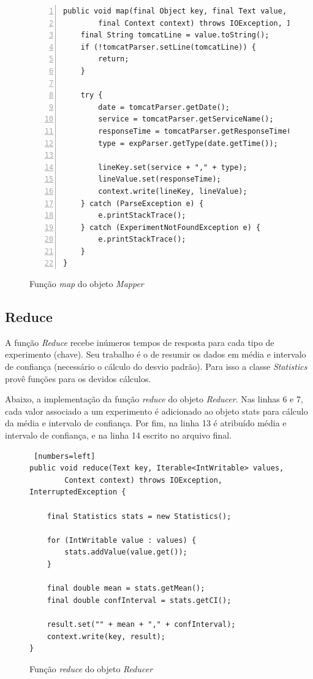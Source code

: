 \documentclass[brazil, a4paper,12pt]{article}
\begin{document}
\begin{figure} [!htb]
\begin{center}
\footnotesize
\begin{lstlisting}[numbers=left]
public void map(final Object key, final Text value,
		final Context context) throws IOException, InterruptedException {
	final String tomcatLine = value.toString();
	if (!tomcatParser.setLine(tomcatLine)) {
		return;
	}

	try {
		date = tomcatParser.getDate();
		service = tomcatParser.getServiceName();
		responseTime = tomcatParser.getResponseTime();
		type = expParser.getType(date.getTime());

		lineKey.set(service + "," + type);
		lineValue.set(responseTime);
		context.write(lineKey, lineValue);
	} catch (ParseException e) {
		e.printStackTrace();
	} catch (ExperimentNotFoundException e) {
		e.printStackTrace();
	}
}
\end{lstlisting}
\end{center}
\caption{Função \emph{map} do objeto \emph{Mapper}}
\end{figure}


\subsection{Reduce}
A função \emph{Reduce} recebe inúmeros tempos de resposta para cada tipo de
experimento (chave). Seu trabalho é o de resumir os dados em média e intervalo
de confiança (necessário o cálculo do desvio padrão). Para isso a classe
\emph{Statistics} provê funções para os devidos cálculos.

Abaixo, a implementação da função \emph{reduce} do objeto \emph{Reducer}. Nas
linhas 6 e 7, cada valor associado a um experimento é adicionado ao objeto
stats para cálculo da média e intervalo de confiança. Por fim, na linha 13 é
atribuído média e intervalo de confiança, e na linha 14 escrito no arquivo
final.

\begin{figure} [!htb]
\begin{center}
\footnotesize
\begin{lstlisting} [numbers=left]
public void reduce(Text key, Iterable<IntWritable> values,
		Context context) throws IOException, InterruptedException {

	final Statistics stats = new Statistics();

	for (IntWritable value : values) {
		stats.addValue(value.get());
	}

	final double mean = stats.getMean();
	final double confInterval = stats.getCI();

	result.set("" + mean + "," + confInterval);
	context.write(key, result);
}
\end{lstlisting}
\end{center}
\caption{Função \emph{reduce} do objeto \emph{Reducer}}
\end{figure}
\end{document}

